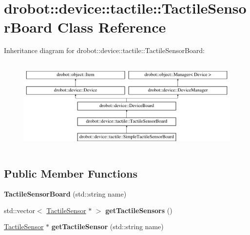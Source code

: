 \hypertarget{classdrobot_1_1device_1_1tactile_1_1TactileSensorBoard}{\section{drobot\-:\-:device\-:\-:tactile\-:\-:Tactile\-Sensor\-Board Class Reference}
\label{classdrobot_1_1device_1_1tactile_1_1TactileSensorBoard}
}
Inheritance diagram for drobot\-:\-:device\-:\-:tactile\-:\-:Tactile\-Sensor\-Board\-:\begin{figure}[H]
\begin{center}
\leavevmode
\includegraphics[height=4.778157cm]{classdrobot_1_1device_1_1tactile_1_1TactileSensorBoard}
\end{center}
\end{figure}
\subsection*{Public Member Functions}
\begin{DoxyCompactItemize}
\item 
\hypertarget{classdrobot_1_1device_1_1tactile_1_1TactileSensorBoard_afe6aa518491c12cfe7f11011473bea0c}{{\bfseries Tactile\-Sensor\-Board} (std\-::string name)}\label{classdrobot_1_1device_1_1tactile_1_1TactileSensorBoard_afe6aa518491c12cfe7f11011473bea0c}

\item 
\hypertarget{classdrobot_1_1device_1_1tactile_1_1TactileSensorBoard_a5663bddd91d2fc3c54f00a5a7a10d91f}{std\-::vector$<$ \hyperlink{classdrobot_1_1device_1_1tactile_1_1TactileSensor}{Tactile\-Sensor} $\ast$ $>$ {\bfseries get\-Tactile\-Sensors} ()}\label{classdrobot_1_1device_1_1tactile_1_1TactileSensorBoard_a5663bddd91d2fc3c54f00a5a7a10d91f}

\item 
\hypertarget{classdrobot_1_1device_1_1tactile_1_1TactileSensorBoard_a1fe8a3ffa05557b3069a789090f2bc61}{\hyperlink{classdrobot_1_1device_1_1tactile_1_1TactileSensor}{Tactile\-Sensor} $\ast$ {\bfseries get\-Tactile\-Sensor} (std\-::string name)}\label{classdrobot_1_1device_1_1tactile_1_1TactileSensorBoard_a1fe8a3ffa05557b3069a789090f2bc61}

\end{DoxyCompactItemize}
